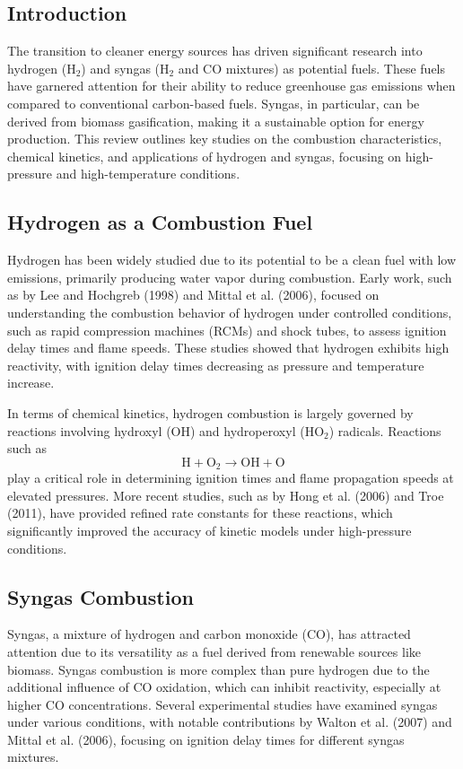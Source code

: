 \documentclass[12pt]{report}
\begin{document}
\subsection{Introduction}
The transition to cleaner energy sources has driven significant research into hydrogen (H$_2$) and syngas (H$_2$ and CO mixtures) as potential fuels. These fuels have garnered attention for their ability to reduce greenhouse gas emissions when compared to conventional carbon-based fuels. Syngas, in particular, can be derived from biomass gasification, making it a sustainable option for energy production. This review outlines key studies on the combustion characteristics, chemical kinetics, and applications of hydrogen and syngas, focusing on high-pressure and high-temperature conditions.

\subsection{Hydrogen as a Combustion Fuel}
Hydrogen has been widely studied due to its potential to be a clean fuel with low emissions, primarily producing water vapor during combustion. Early work, such as by Lee and Hochgreb (1998) and Mittal et al. (2006), focused on understanding the combustion behavior of hydrogen under controlled conditions, such as rapid compression machines (RCMs) and shock tubes, to assess ignition delay times and flame speeds. These studies showed that hydrogen exhibits high reactivity, with ignition delay times decreasing as pressure and temperature increase.

In terms of chemical kinetics, hydrogen combustion is largely governed by reactions involving hydroxyl (OH) and hydroperoxyl (HO$_2$) radicals. Reactions such as 
\begin{equation}
\text{H} + \text{O}_2 \rightarrow \text{OH} + \text{O}
\end{equation}
play a critical role in determining ignition times and flame propagation speeds at elevated pressures. More recent studies, such as by Hong et al. (2006) and Troe (2011), have provided refined rate constants for these reactions, which significantly improved the accuracy of kinetic models under high-pressure conditions.

\subsection{Syngas Combustion}
Syngas, a mixture of hydrogen and carbon monoxide (CO), has attracted attention due to its versatility as a fuel derived from renewable sources like biomass. Syngas combustion is more complex than pure hydrogen due to the additional influence of CO oxidation, which can inhibit reactivity, especially at higher CO concentrations. Several experimental studies have examined syngas under various conditions, with notable contributions by Walton et al. (2007) and Mittal et al. (2006), focusing on ignition delay times for different syngas mixtures.
\end{document}
